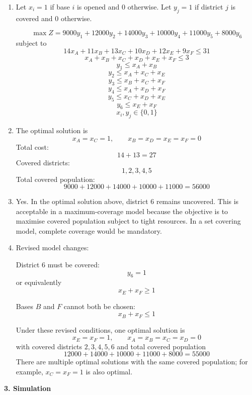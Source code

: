 \documentclass[11pt,a4paper]{article}
\begin{document}
\begin{enumerate}
\item Let $x_i=1$ if base $i$ is opened and 0 otherwise.
Let $y_j=1$ if district $j$ is covered and 0 otherwise.

\[
\max Z = 9000y_1+12000y_2+14000y_3+10000y_4+11000y_5+8000y_6
\]
subject to
\[
14x_A+11x_B+13x_C+10x_D+12x_E+9x_F \le 31
\]
\[
x_A+x_B+x_C+x_D+x_E+x_F \le 3
\]
\[
y_1 \le x_A+x_B
\]
\[
y_2 \le x_A+x_C+x_E
\]
\[
y_3 \le x_B+x_C+x_F
\]
\[
y_4 \le x_A+x_D+x_F
\]
\[
y_5 \le x_C+x_D+x_E
\]
\[
y_6 \le x_E+x_F
\]
\[
x_i,y_j \in \{0,1\}
\]

\item The optimal solution is
\[
x_A=x_C=1,\qquad x_B=x_D=x_E=x_F=0
\]
Total cost:
\[
14+13=27
\]
Covered districts:
\[
1,2,3,4,5
\]
Total covered population:
\[
9000+12000+14000+10000+11000=56000
\]

\item Yes. In the optimal solution above, district 6 remains uncovered. This is acceptable in a maximum-coverage model because the objective is to maximise covered population subject to tight resources. In a set covering model, complete coverage would be mandatory.

\item Revised model changes:

District 6 must be covered:
\[
y_6 = 1
\]
or equivalently
\[
x_E+x_F \ge 1
\]

Bases $B$ and $F$ cannot both be chosen:
\[
x_B+x_F \le 1
\]

Under these revised conditions, one optimal solution is
\[
x_E=x_F=1,\qquad x_A=x_B=x_C=x_D=0
\]
with covered districts $2,3,4,5,6$ and total covered population
\[
12000+14000+10000+11000+8000=55000
\]
There are multiple optimal solutions with the same covered population; for example, $x_C=x_F=1$ is also optimal.
\end{enumerate}

\textbf{3. Simulation}
\end{document}
